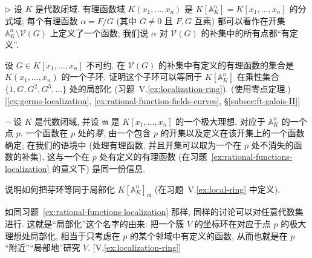 \begin{prob}\label{ex:rational-functions-localization}
$\triangleright$ 设 $K$ 是代数闭域. 有理函数域 $K(x_1,\ldots ,x_n)$ 是 $K[\mathbb{A}_K^n]=K[x_1,\ldots ,x_n]$ 的分式域; 每个有理函数 $\alpha=F/G$ (其中 $G\neq 0$ 且 $F,G$ 互素) 都可以看作在开集 $\mathbb{A}_K^n\setminus\mathcal{V}(G)$ 上定义了一个函数; 我们说 $\alpha$ 对 $\mathcal{V}(G)$ 的补集中的所有点都``有定义''.

设 $G\in K[x_1,\ldots ,x_n]$ 不可约. 在 $\mathcal{V}(G)$ 的补集中有定义的有理函数的集合是 $K(x_1,\ldots ,x_n)$ 的一个子环. 证明这个子环可以等同于 $K[\mathbb{A}_K^n]$ 在乘性集合 $\{1,G,G^2,G^3,\ldots \}$ 处的局部化 (习题~V.\ref{ex:localization-ring}). (使用零点定理.)
[\ref{ex:germs-localization}, \ref{ex:rational-function-fields-curves}, \S\ref{subsec:ft-galois-II}]
\end{prob}

\begin{prob}\label{ex:germs-localization}
$\neg$ 设 $K$ 是代数闭域, 并设 $\mathfrak{m}$ 是 $K[x_1,\ldots ,x_n]$ 的一个极大理想, 对应于 $\mathbb{A}_K^n$ 的一个点 $p$. 一个函数在 $p$ 处的\emph{芽}, 由一个包含 $p$ 的开集以及定义在该开集上的一个函数确定; 在我们的语境中 (处理有理函数, 并且开集可以取为一个在 $p$ 处不消失的函数的补集), 这与一个在 $p$ 处有定义的有理函数 (在习题~\ref{ex:rational-functions-localization} 的意义下) 是同一份信息.

说明如何把芽环等同于局部化 $K[\mathbb{A}_K^n]_{\mathfrak{m}}$ (在习题~V.\ref{ex:local-ring} 中定义).

如同习题~\ref{ex:rational-functions-localization} 那样, 同样的讨论可以对任意代数集进行. 这就是``局部化''这个名字的由来: 把一个簇 $V$ 的坐标环在对应于点 $p$ 的极大理想处局部化, 相当于只考虑在 $p$ 的某个邻域中有定义的函数, 从而也就是在 $p$ ``附近''``局部地''研究 $V$. [V.\ref{ex:localization-ring}]
\end{prob}


